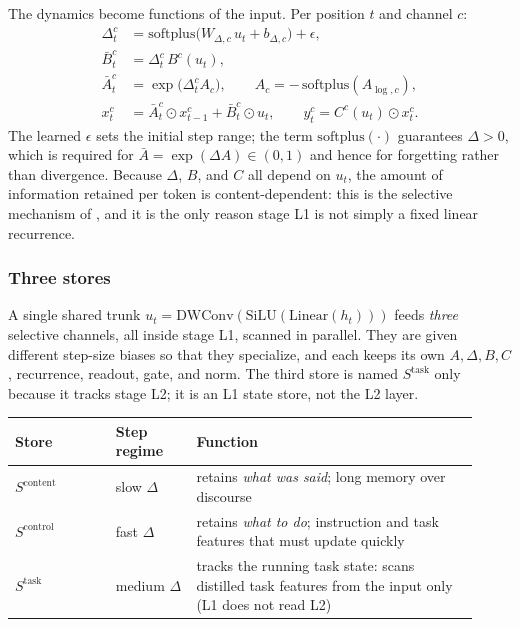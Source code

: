 \documentclass[11pt,a4paper]{article}
\newcommand{\Atr}{\bar{A}}
\newcommand{\Btr}{\bar{B}}
\theoremstyle{plain}
\theoremstyle{definition}
\theoremstyle{remark}
\begin{document}
\noindent
The dynamics become functions of the input. Per position $t$ and channel $c$:
\begin{align}
  \Delta^c_t &= \mathrm{softplus}\bigl(W_{\Delta,c}\, u_t + b_{\Delta,c}\bigr) + \epsilon, \label{eq:sel-delta}\\
  \Btr^c_t &= \Delta^c_t\, B^c(u_t), \label{eq:sel-b}\\
  \Atr^c_t &= \exp\bigl(\Delta^c_t A_c\bigr), \qquad A_c = -\,\mathrm{softplus}(A_{\log,c}), \label{eq:sel-a}\\
  x^c_t &= \Atr^c_t \odot x^c_{t-1} + \Btr^c_t \odot u_t, \qquad
           y^c_t = C^c(u_t) \odot x^c_t . \label{eq:sel-rec}
\end{align}
The learned $\epsilon$ sets the initial step range; the term
$\mathrm{softplus}(\cdot)$ guarantees $\Delta > 0$, which is required for
$\Atr = \exp(\Delta A) \in (0,1)$ and hence for forgetting rather than
divergence. Because $\Delta$, $B$, and $C$ all depend on $u_t$, the amount of
information retained per token is content-dependent: this is the selective
mechanism of \cite{gu2023mamba}, and it is the only reason stage L1 is not
simply a fixed linear recurrence.

\subsubsection{Three stores}

\noindent
A single shared trunk $u_t = \mathrm{DWConv}(\mathrm{SiLU}(\mathrm{Linear}(h_t)))$
feeds \emph{three} selective channels, all inside stage L1, scanned in parallel.
They are given different step-size biases so that they specialize, and each keeps
its own $A, \Delta, B, C$, recurrence, readout, gate, and norm. The third store
is named $S^{\mathrm{task}}$ only because it tracks stage L2; it is an L1
state store, not the L2 layer.

\begin{center}
\small
\begin{tabular}{@{}>{\raggedright\arraybackslash}p{0.20\linewidth}>{\raggedright\arraybackslash}p{0.16\linewidth}>{\raggedright\arraybackslash}p{0.56\linewidth}@{}}
\toprule
\rowcolor{ekHeadBG}\color{white}\textbf{Store} & \color{white}\textbf{Step regime} & \color{white}\textbf{Function} \\
\midrule
\rowcolor{ekRowL}$S^{\mathrm{content}}$ & slow $\Delta$ & retains \emph{what was said}; long memory over discourse \\
\rowcolor{ekRowL}$S^{\mathrm{control}}$ & fast $\Delta$ & retains \emph{what to do}; instruction and task features that must update quickly \\
\rowcolor{ekRowL}$S^{\mathrm{task}}$ & medium $\Delta$ & tracks the running task state: scans distilled task features from the input only (L1 does not read L2) \\
\bottomrule
\end{tabular}
\end{center}
\end{document}
